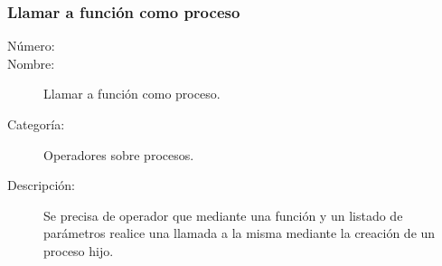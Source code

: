 \subsubsection{Llamar a función como proceso}
	\begin{description}
		\item [Número:] \cn
		\item [Nombre:] Llamar a función como proceso.
		\item [Categoría:] Operadores sobre procesos.
		\item [Descripción:] Se precisa de operador que mediante una función y un listado de parámetros realice una llamada 
		a la misma mediante la creación de un proceso hijo.
	\end{description}
